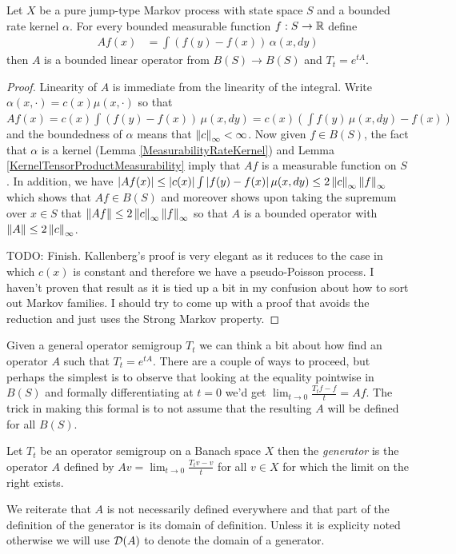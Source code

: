 \begin{prop}Let $X$ be a pure jump-type Markov process with state space $S$ and a bounded rate kernel $\alpha$.  For every bounded measurable function $f : S \to \mathbb{R}$ define
\begin{align*}
Af (x) &= \int (f(y) - f(x)) \, \alpha(x, dy)
\end{align*}
then $A$ is a bounded linear operator from $B(S) \to B(S)$ and $T_t = e^{tA}$.
\end{prop}
\begin{proof}
Linearity of $A$ is immediate from the linearity of the integral.  Write $\alpha(x,\cdot) = c(x) \mu(x, \cdot)$ so that $Af(x) = c(x) \int (f(y) - f(x)) \, \mu(x, dy) = c(x) (\int f(y) \, \mu(x, dy) - f(x))$ and the boundedness of $\alpha$ means that $\left \lVert c \right \rVert_\infty < \infty$.  Now given $f \in B(S)$, the fact that $\alpha$ is a kernel (Lemma \ref{MeasurabilityRateKernel}) and Lemma \ref{KernelTensorProductMeasurability} imply that $Af$ is a measurable function on $S$.  In addition, we have $\left \vert Af(x) \right \vert \leq \left \vert c(x) \right \vert \int \left \vert f(y) - f(x) \right \vert \mu(x, dy) \leq 2 \left \lVert c \right \rVert_\infty \left \lVert f \right \rVert_\infty$ which shows that $Af \in B(S)$ and moreover shows upon taking the supremum over $x \in S$ that $\left \lVert Af \right \rVert \leq 2 \left \lVert c \right \rVert_\infty \left \lVert f \right \rVert_\infty$ so that $A$ is a bounded operator with $\left \lVert A \right \rVert \leq 2 \left \lVert c \right \rVert_\infty$.  

TODO:  Finish.  Kallenberg's proof is very elegant as it reduces to the case in which $c(x)$ is constant and therefore we have a pseudo-Poisson process.  I haven't proven that result as it is tied up a bit in my confusion about how to sort out Markov families.  I should try to come up with a proof that avoids the reduction and just uses the Strong Markov property.
\end{proof}

Given a general operator semigroup $T_t$ we can think a bit about how find an operator $A$ such that $T_t = e^{tA}$.  There are a couple of ways to proceed, but perhaps the simplest is to observe that looking at the equality pointwise in $B(S)$  and formally differentiating at $t=0$ we'd get $\lim_{t \to 0} \frac{T_tf - f}{t} = Af$.  The trick in making this formal is to not assume that the resulting $A$ will be defined for all $B(S)$.
\begin{defn}Let $T_t$ be an operator semigroup on a Banach space $X$ then the \emph{generator} is the operator $A$ defined by $A v = \lim_{t \to 0} \frac{T_tv -v}{t}$ for all $v \in X$ 
for which the limit on the right exists.  
\end{defn}
We reiterate that $A$ is not necessarily defined everywhere and that part of the definition of the generator is its domain of definition.  Unless it is explicity noted otherwise we will use $\mathcal{D}(A)$ to denote the domain of a generator.

